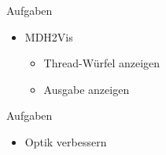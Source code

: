 \documentclass{../presentation}
\begin{document}
\frame[plain]{\titlepage}

\begin{frame}{Aufgaben}
    \begin{itemize}
        \item MDH2Vis
        
        \begin{itemize}
            \item Thread-Würfel anzeigen
            \item Ausgabe anzeigen
        \end{itemize}
    \end{itemize}
\end{frame}

\begin{frame}{Aufgaben}
    \begin{itemize}
        \item Optik verbessern
    \end{itemize}
\end{frame}
\end{document}
